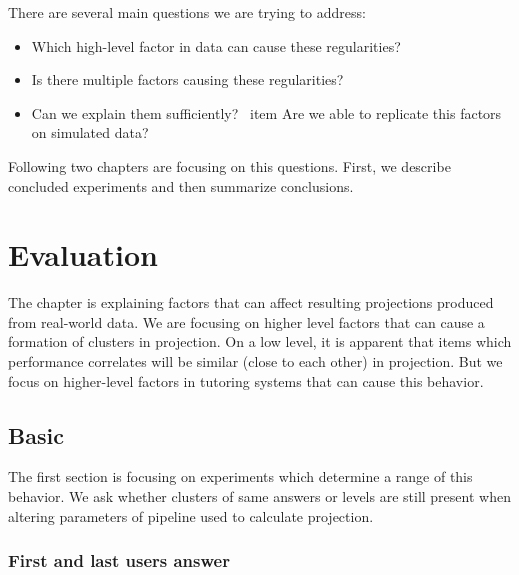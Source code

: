 \documentclass[
  digital, %
  table,   %
  nolof,     %
  nolot,     %
  nocover,
  color,
  final, %
]{fithesis3}
\begin{document}
There are several main questions we are trying to address:

\begin{itemize}
 \item Which high-level factor in data can cause these regularities?
 \item Is there multiple factors causing these regularities?
 \item Can we explain them sufficiently?
 \ item Are we able to replicate this factors on simulated data?
\end{itemize}


Following two chapters are focusing on this questions. First, we describe concluded experiments and then summarize conclusions.


\chapter{Evaluation}\label{evaluation}

The chapter is explaining factors that can affect resulting projections produced from real-world data. We are focusing on higher level factors that can cause a formation of clusters in projection. On a low level, it is apparent that items which performance correlates will be similar (close to each other) in projection. But we focus on higher-level factors in tutoring systems that can cause this behavior.


\section{Basic}\label{evaluation-basic}

The first section is focusing on experiments which determine a range of this behavior. We ask whether clusters of same answers or levels are still present when altering parameters of pipeline used to calculate projection.


\subsection{First and last users answer}\label{first-and-last-users-answer}

\end{document}
